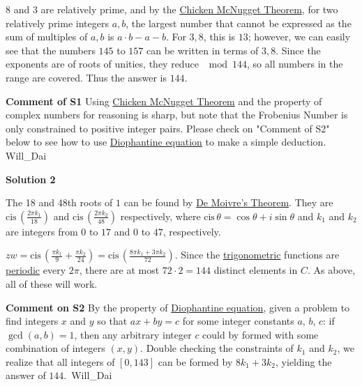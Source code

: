 \begin{enumerate}
 $8$ and $3$ are relatively prime, and by the \href{https://artofproblemsolving.com/wiki/index.php?title=Chicken\_McNugget\_Theorem}{Chicken McNugget Theorem}, for two relatively prime integers $a,b$, the largest number that cannot be expressed as the sum of multiples of $a,b$ is $a \cdot b - a - b$. For $3,8$, this is $13$; however, we can easily see that the numbers $145$ to $157$ can be written in terms of $3,8$. Since the exponents are of roots of unities, they reduce $\mod{144}$, so all numbers in the range are covered. Thus the answer is $\boxed{144}$.

 \textbf{Comment of S1} Using \href{https://artofproblemsolving.com/wiki/index.php?title=Chicken\_McNugget\_Theorem}{Chicken McNugget Theorem} and the property of complex numbers for reasoning is sharp, but note that the Frobenius Number is only constrained to positive integer pairs. Please check on "Comment of S2" below to see how to use \href{https://artofproblemsolving.com/wiki/index.php?title=Diophantine\_equation}{Diophantine equation} to make a simple deduction. ~ Will\_Dai

 



\textbf{Solution 2}

The 18 and 48th roots of $1$ can be found by \href{https://artofproblemsolving.com/wiki/index.php?title=De\_Moivre\%27s\_Theorem}{De Moivre's Theorem}. They are $\text{cis}\,\left(\frac{2\pi k_1}{18}\right)$ and $\text{cis}\,\left(\frac{2\pi k_2}{48}\right)$ respectively, where $\text{cis}\,\theta = \cos \theta + i \sin \theta$ and $k_1$ and $k_2$ are integers from $0$ to $17$ and $0$ to $47$, respectively. 

 $zw = \text{cis}\,\left(\frac{\pi k_1}{9} + \frac{\pi k_2}{24}\right) = \text{cis}\,\left(\frac{8\pi k_1 + 3 \pi k_2}{72}\right)$. Since the \href{https://artofproblemsolving.com/wiki/index.php?title=Trigonometry}{trigonometric} functions are \href{https://artofproblemsolving.com/wiki/index.php?title=Periodic\_function}{periodic} every $2\pi$, there are at most $72 \cdot 2 = \boxed{144}$ distinct elements in $C$. As above, all of these will work.

 \textbf{Comment on S2} By the property of \href{https://artofproblemsolving.com/wiki/index.php?title=Diophantine\_equation}{Diophantine equation}, given a problem to find integers $x$ and $y$ so that $ax + by = c$ for some integer constants $a$, $b$, $c$: if $\gcd(a, b) = 1$, then any arbitrary integer $c$ could by formed with some combination of integers $(x, y)$. Double checking the constraints of $k_1$ and $k_2$, we realize that all integers of $[0, 143]$ can be formed by $8k_1 + 3k_2$, yielding the answer of $144$.~Will\_Dai


\end{enumerate}
